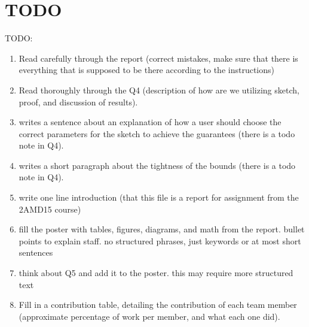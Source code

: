 \section{TODO}

TODO:
\begin{enumerate}
    \item Read carefully through the report (correct mistakes, make sure that there is everything that is supposed to be there according to the instructions)
    \item Read thoroughly through the Q4 (description of how are we utilizing sketch, proof, and discussion of results).
    \item writes a sentence about an explanation of how a user should choose the correct parameters for the sketch to achieve the guarantees (there is a todo note in Q4).
    \item writes a short paragraph about the tightness of the bounds (there is a todo note in Q4).
    \item write one line introduction (that this file is a report for assignment from the 2AMD15 course)
    \item fill the poster with tables, figures, diagrams, and math from the report. bullet points to explain staff. no structured phrases, just keywords or at most short sentences
    \item think about Q5 and add it to the poster. this may require more structured text
    \item Fill in a contribution table, detailing the contribution of each team member (approximate percentage of work per member, and what each one did).
\end{enumerate}
